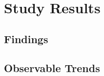 

\section{Study Results}
\label{sec:study-results}

\subsection{Findings}
\label{subsec:findings}

\subsection{Observable Trends}
\label{subsec:observable-trends}

